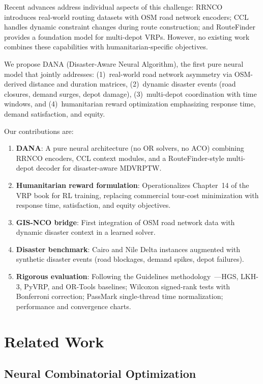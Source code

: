 \documentclass[12pt,a4paper]{article}
\begin{document}
Recent advances address individual aspects of this challenge: RRNCO~\cite{rrnco2026}
introduces real-world routing datasets with OSM road network encoders;
CCL~\cite{ccl2026} handles dynamic constraint changes during route construction;
and RouteFinder~\cite{routefinder2024} provides a foundation model for
multi-depot VRPs. However, no existing work combines these capabilities with
humanitarian-specific objectives.

We propose DANA (Disaster-Aware Neural Algorithm), the first pure neural model
that jointly addresses: (1)~real-world road network asymmetry via OSM-derived
distance and duration matrices, (2)~dynamic disaster events (road closures,
demand surges, depot damage), (3)~multi-depot coordination with time windows,
and (4)~humanitarian reward optimization emphasizing response time, demand
satisfaction, and equity.

Our contributions are:

\begin{enumerate}
	\item \textbf{DANA}: A pure neural architecture (no OR solvers, no ACO)
	      combining RRNCO encoders, CCL context modules, and a RouteFinder-style
	      multi-depot decoder for disaster-aware MDVRPTW.
	\item \textbf{Humanitarian reward formulation}: Operationalizes Chapter~14 of
	      the VRP book for RL training, replacing commercial tour-cost minimization
	      with response time, satisfaction, and equity objectives.
	\item \textbf{GIS-NCO bridge}: First integration of OSM road network data
	      with dynamic disaster context in a learned solver.
	\item \textbf{Disaster benchmark}: Cairo and Nile Delta instances augmented
	      with synthetic disaster events (road blockages, demand spikes, depot
	      failures).
	\item \textbf{Rigorous evaluation}: Following the Guidelines
	      methodology~\cite{guidelines2021}---HGS, LKH-3, PyVRP, and OR-Tools
	      baselines; Wilcoxon signed-rank tests with Bonferroni correction; PassMark
	      single-thread time normalization; performance and convergence charts.
\end{enumerate}

\section{Related Work}

\subsection{Neural Combinatorial Optimization}
\end{document}
